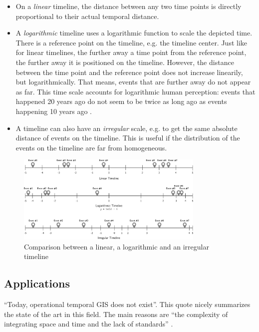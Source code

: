 \begin{itemize}
  \item On a \emph{linear} timeline, the distance between any two time points is directly proportional to their actual temporal distance.
  \item A \emph{logarithmic} timeline uses a logarithmic function to scale the depicted time. There is a reference point on the timeline, e.g. the timeline center. Just like for linear timelines, the further away a time point from the reference point, the further away it is positioned on the timeline. However, the distance between the time point and the reference point does not increase linearily, but logarithmically. That means, events that are further away do not appear as far. This time scale accounts for logarithmic human perception: events that happened 20 years ago do not seem to be twice as long ago as events happening 10 years ago
  \cite{logorlinear}.
  \item A timeline can also have an \emph{irregular} scale, e.g. to get the same absolute distance of events on the timeline. This is useful if the distribution of the events on the timeline are far from homogeneous.
\end{itemize}

\begin{figure}[ht]
  \centering
  \includegraphics[width=0.8\textwidth]{graphics/basics/hgis/timelines}
  \caption{Comparison between a linear, a logarithmic and an irregular timeline}
  \label{fig:timelines}
\end{figure}


\subsection{Applications} %
\label{sub:applications}

``Today, operational temporal GIS does not exist''. This quote nicely summarizes the state of the art in this field. The main reasons are ``the complexity of integrating space and time and the lack of standards''
\cite[p. 5]{raza12}.

